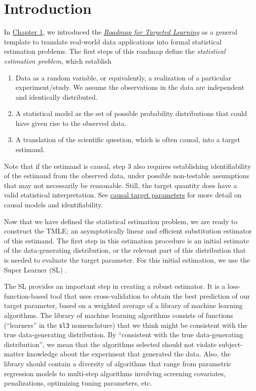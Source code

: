 \documentclass[12pt, krantz2,]{book}
\providecommand{\tightlist}{%
  \setlength{\itemsep}{0pt}\setlength{\parskip}{0pt}}
\theoremstyle{definition}
\theoremstyle{definition}
\theoremstyle{definition}
\newcommand{\1}{\mathbbm{1}}
\begin{document}
\hypertarget{introduction-2}{%
\section*{Introduction}\label{introduction-2}}


In \protect\hyperlink{intro}{Chapter 1}, we introduced the \protect\hyperlink{roadmap}{\emph{Roadmap for Targeted
Learning}} as a general template to translate real-world data
applications into formal statistical estimation problems. The first steps of
this roadmap define the \emph{statistical estimation problem}, which establish

\begin{enumerate}
\def\labelenumi{\arabic{enumi}.}
\tightlist
\item
  Data as a random variable, or equivalently, a realization of a particular
  experiment/study. We assume the observations in the data are independent and
  identically distributed.
\item
  A statistical model as the set of possible probability distributions that
  could have given rise to the observed data.
\item
  A translation of the scientific question, which is often causal, into a
  target estimand.
\end{enumerate}

Note that if the estimand is causal, step 3 also requires establishing
identifiability of the estimand from the observed data, under possible
non-testable assumptions that may not necessarily be reasonable. Still, the
target quantity does have a valid statistical interpretation. See \protect\hyperlink{causal}{causal target
parameters} for more detail on causal models and identifiability.

Now that we have defined the statistical estimation problem, we are ready to
construct the TMLE; an asymptotically linear and efficient substitution
estimator of this estimand. The first step in this estimation procedure is an
initial estimate of the data-generating distribution, or the relevant part of
this distribution that is needed to evaluate the target parameter. For this
initial estimation, we use the Super Learner (SL) \citep{vdl2007super}.

The SL provides an important step in creating a robust estimator. It is a
loss-function-based tool that uses cross-validation to obtain the best
prediction of our target parameter, based on a weighted average of a library of
machine learning algorithms. The library of machine learning algorithms consists
of functions (``learners'' in the \texttt{sl3} nomenclature) that we think might be
consistent with the true data-generating distribution. By ``consistent with the
true data-generating distribution'', we mean that the algorithms selected should
not violate subject-matter knowledge about the experiment that generated the
data. Also, the library should contain a diversity of algorithms that range from
parametric regression models to multi-step algorithms involving screening
covariates, penalizations, optimizing tuning parameters, etc.
\end{document}
